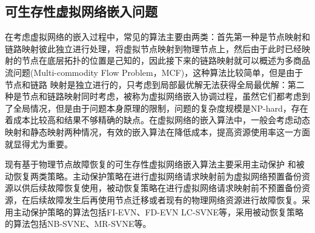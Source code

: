 

\subsection{可生存性虚拟网络嵌入问题}
在考虑虚拟网络的嵌入过程中，常见的算法主要由两类：首先第一种是节点映射和链路映射彼此独立进行处理，将虚拟节点映射到物理节点上，然后由于此时已经映射的节点在底层拓扑的位置是己知的，因此接下来的链路映射就可以概述为多商品流问题\cite{even1975complexity}(Multi-commodity Flow Problem，MCF)，这种算法比较简单，但是由于节点和链路 映射是独立进行的，只考虑到局部最优解无法获得全局最优解：第二种是节点和链路映射同时考虑，被称为虚拟网络嵌入协调过程，虽然它们都考虑到了全局情况，但是由于问题本身原理的限制，问题的复杂度规模是NP-hard，存在着成本比较高和结果不够精确的缺点。在虚拟网络的嵌入算法中，一般会考虑动态映射和静态映射两种情况\cite{fischer2013virtual}，有效的嵌入算法在降低成本，提高资源使用率这一方面就显得尤为重要。



现有基于物理节点故障恢复的可生存性虚拟网络嵌入算法主要采用主动保护\cite{yu2011cost,wang2014survivable,sun2010efficient,hu2012location} 和被动恢复\cite{rahman2010survivable,qiang2014heuristic,bo2014dynamic}两类策略。主动保护策略在进行虚拟网络请求映射前为虚拟网络预置备份资源以供后续故障恢复使用，被动恢复策略在进行虚拟网络请求映射前不预置备份资源，在后续故障发生后再使用节点迁移或者现有的物理网络资源进行故障恢复。采用主动保护策略的算法包括FI-EVN\cite{yu2011cost}、FD-EVN\cite{wang2014survivable} LC-SVNE\cite{hu2012location}等，采用被动恢复策略的算法包括NB-SVNE\cite{bo2014dynamic}、MR-SVNE\cite{qiang2014heuristic}等。

